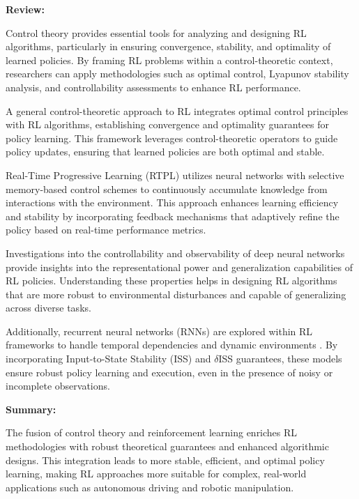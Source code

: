 \documentclass{article}
\theoremstyle{plain}
\theoremstyle{definition}
\theoremstyle{remark}
\begin{document}
\textbf{Review:}

Control theory provides essential tools for analyzing and designing RL algorithms, particularly in ensuring convergence, stability, and optimality of learned policies. By framing RL problems within a control-theoretic context, researchers can apply methodologies such as optimal control, Lyapunov stability analysis, and controllability assessments to enhance RL performance.

A general control-theoretic approach to RL \cite{chenGeneralControltheoreticApproach2024} integrates optimal control principles with RL algorithms, establishing convergence and optimality guarantees for policy learning. This framework leverages control-theoretic operators to guide policy updates, ensuring that learned policies are both optimal and stable.

Real-Time Progressive Learning (RTPL) \cite{feiRealtimeProgressiveLearning2023} utilizes neural networks with selective memory-based control schemes to continuously accumulate knowledge from interactions with the environment. This approach enhances learning efficiency and stability by incorporating feedback mechanisms that adaptively refine the policy based on real-time performance metrics.

Investigations into the controllability and observability of deep neural networks \cite{chengInterpolationApproximationControllability2023} provide insights into the representational power and generalization capabilities of RL policies. Understanding these properties helps in designing RL algorithms that are more robust to environmental disturbances and capable of generalizing across diverse tasks.

Additionally, recurrent neural networks (RNNs) are explored within RL frameworks to handle temporal dependencies and dynamic environments \cite{bonassiRecurrentNeuralNetworks2022}. By incorporating Input-to-State Stability (ISS) and $\delta$ISS guarantees, these models ensure robust policy learning and execution, even in the presence of noisy or incomplete observations.

\textbf{Summary:}

The fusion of control theory and reinforcement learning enriches RL methodologies with robust theoretical guarantees and enhanced algorithmic designs. This integration leads to more stable, efficient, and optimal policy learning, making RL approaches more suitable for complex, real-world applications such as autonomous driving and robotic manipulation.




\end{document}

